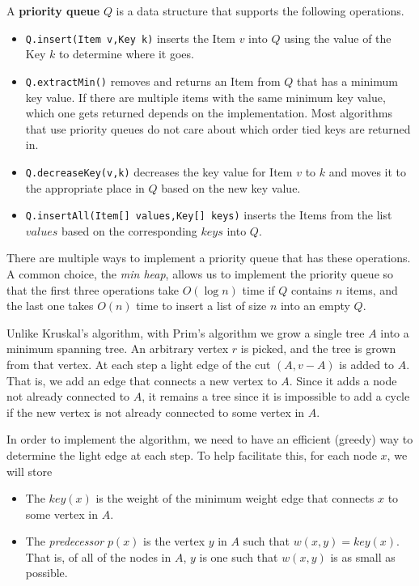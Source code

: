 \begin{df}
A {\bf priority queue} $Q$ is a data structure that supports the
following operations.
\begin{itemize}
\item
\verb+Q.insert(Item v,Key k)+ inserts the Item $v$ into $Q$ using the value of the Key $k$ to determine where it goes.
\item
\verb+Q.extractMin()+ removes and returns an Item from $Q$ 
that has a minimum key value. If there are multiple items with
the same minimum key value, which one gets returned depends
on the implementation. Most algorithms that
use priority queues do not care about which order tied keys are returned in.
\item
\verb+Q.decreaseKey(v,k)+ decreases the key value for Item $v$
to $k$ and moves it to the appropriate place in $Q$ 
based on the new key value.
\item
\verb+Q.insertAll(Item[] values,Key[] keys)+ 
inserts the Items from the list $values$ based on the corresponding 
$keys$ into $Q$.
\end{itemize}
\end{df}

There are multiple ways to implement a priority queue that has these
operations. A common choice, the {\em min heap}, allows us to
implement the priority queue so that the first three operations take 
$O(\log n)$ time if $Q$ contains $n$ items, and the last one
takes $O(n)$ time to insert a list of size $n$ into an empty $Q$.

Unlike Kruskal's algorithm, with Prim's algorithm
we grow a single tree $A$ into a minimum spanning tree.
An arbitrary vertex $r$ is picked, and the tree is grown
from that vertex.
At each step a light edge of the cut $(A,v-A)$ is added
to $A$. That is, we add an edge that connects a new vertex to $A$.
Since it adds a node not already connected to $A$, it remains a tree
since it is impossible to add a cycle if the new vertex is not 
already connected to some vertex in $A$.

In order to implement the algorithm, 
we need to have an efficient (greedy) way to determine
the light edge at each step.
To help facilitate this, for each node $x$, we will store
\begin{itemize}
\item
The $key(x)$ is the weight of the 
minimum weight edge that connects
$x$ to some vertex in $A$.
\item
The {\em predecessor} $p(x)$ is the vertex $y$ in $A$ such that $w(x,y)=key(x)$.
That is, of all of the nodes in $A$, $y$ is one such that
$w(x,y)$ is as small as possible.
\end{itemize}

